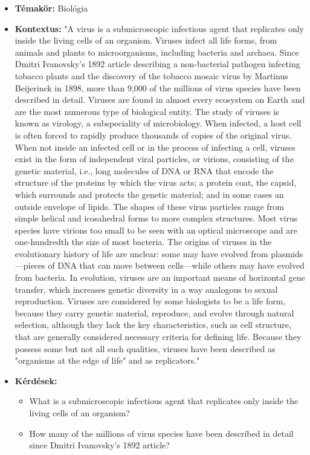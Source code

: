 \begin{itemize}
\item \textbf{Témakör:} Biológia
\item \textbf{Kontextus:} "A virus is a submicroscopic infectious agent that replicates only inside the living cells of an organism. Viruses infect all life forms, from animals and plants to microorganisms, including bacteria and archaea. Since Dmitri Ivanovsky's 1892 article describing a non-bacterial pathogen infecting tobacco plants and the discovery of the tobacco mosaic virus by Martinus Beijerinck in 1898, more than 9,000 of the millions of virus species have been described in detail. Viruses are found in almost every ecosystem on Earth and are the most numerous type of biological entity. The study of viruses is known as virology, a subspeciality of microbiology. When infected, a host cell is often forced to rapidly produce thousands of copies of the original virus. When not inside an infected cell or in the process of infecting a cell, viruses exist in the form of independent viral particles, or virions, consisting of the genetic material, i.e., long molecules of DNA or RNA that encode the structure of the proteins by which the virus acts; a protein coat, the capsid, which surrounds and protects the genetic material; and in some cases  an outside envelope of lipids. The shapes of these virus particles range from simple helical and icosahedral forms to more complex structures. Most virus species have virions too small to be seen with an optical microscope and are one-hundredth the size of most bacteria. The origins of viruses in the evolutionary history of life are unclear: some may have evolved from plasmids—pieces of DNA that can move between cells—while others may have evolved from bacteria. In evolution, viruses are an important means of horizontal gene transfer, which increases genetic diversity in a way analogous to sexual reproduction. Viruses are considered by some biologists to be a life form, because they carry genetic material, reproduce, and evolve through natural selection, although they lack the key characteristics, such as cell structure, that are generally considered necessary criteria for defining life. Because they possess some but not all such qualities, viruses have been described as "organisms at the edge of life" and as replicators."
\item \textbf{Kérdések:} 
	\begin{itemize}
		\item What is a submicroscopic infectious agent that replicates only inside the living cells of an organism?
		\item How many of the millions of virus species have been described in detail since Dmitri Ivanovsky's 1892 article?

\end{itemize}
\end{itemize}
